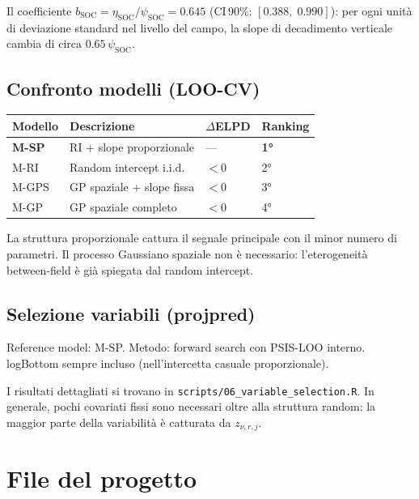 \documentclass[11pt, a4paper]{article}
\newcommand{\SOC}{\mathrm{SOC}}
\begin{document}
\medskip
Il coefficiente $b_{\SOC} = \eta_{\SOC}/\psi_{\SOC} = 0.645$ (CI\,90\%: $[0.388,\; 0.990]$):
per ogni unità di deviazione standard nel livello del campo,
la slope di decadimento verticale cambia di circa $0.65\,\psi_{\SOC}$.

\subsection{Confronto modelli (LOO-CV)}

\begin{center}
\begin{tabular}{@{}llll@{}}
\toprule
Modello & Descrizione & $\Delta$ELPD & Ranking \\
\midrule
\textbf{M-SP} & RI + slope proporzionale & --- & \textbf{1°} \\
M-RI & Random intercept i.i.d. & $<0$ & 2° \\
M-GPS & GP spaziale + slope fissa & $<0$ & 3° \\
M-GP & GP spaziale completo & $<0$ & 4° \\
\bottomrule
\end{tabular}
\end{center}

\noindent La struttura proporzionale cattura il segnale principale con il minor numero di
parametri. Il processo Gaussiano spaziale non è necessario: l'eterogeneità between-field
è già spiegata dal random intercept.

\subsection{Selezione variabili (projpred)}

Reference model: M-SP. Metodo: forward search con PSIS-LOO interno.
logBottom sempre incluso (nell'intercetta casuale proporzionale).

I risultati dettagliati si trovano in \texttt{scripts/06\_variable\_selection.R}.
In generale, pochi covariati fissi sono necessari oltre alla struttura random:
la maggior parte della variabilità è catturata da $z_{\nu,r,j}$.

\section{File del progetto}
\end{document}
